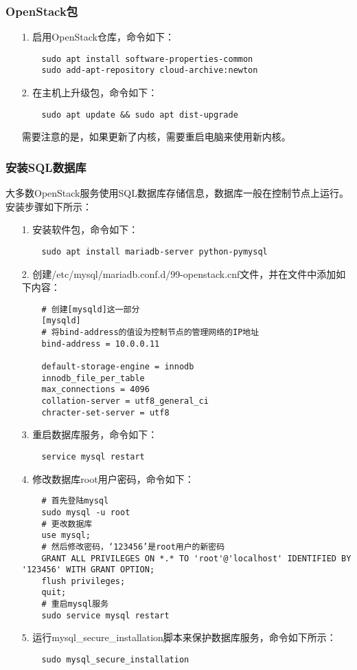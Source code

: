 \documentclass[a4paper,left=2.5cm,right=2.5cm,11pt]{article}
\begin{document}
\subsubsection{OpenStack包}
	\begin{itemize}
		\item[1.] 启用OpenStack仓库，命令如下：
		\begin{lstlisting}
	sudo apt install software-properties-common
	sudo add-apt-repository cloud-archive:newton
		\end{lstlisting}

		\item[2.] 在主机上升级包，命令如下：
		\begin{lstlisting}
	sudo apt update && sudo apt dist-upgrade
		\end{lstlisting}

		需要注意的是，如果更新了内核，需要重启电脑来使用新内核。
	\end{itemize}

\subsubsection{安装SQL数据库}
	大多数OpenStack服务使用SQL数据库存储信息，数据库一般在控制节点上运行。
	安装步骤如下所示：
	\begin{itemize}
		\item[1.] 安装软件包，命令如下：
		\begin{lstlisting}
	sudo apt install mariadb-server python-pymysql
		\end{lstlisting}

		\item[2.] 创建/etc/mysql/mariadb.conf.d/99-openstack.cnf文件，并在文件中添加如下内容：
		\begin{lstlisting}
	# 创建[mysqld]这一部分
	[mysqld]
	# 将bind-address的值设为控制节点的管理网络的IP地址
	bind-address = 10.0.0.11

	default-storage-engine = innodb
	innodb_file_per_table
	max_connections = 4096
	collation-server = utf8_general_ci
	chracter-set-server = utf8
		\end{lstlisting}

		\item[3.] 重启数据库服务，命令如下：
		\begin{lstlisting}
	service mysql restart
		\end{lstlisting}

		\item[4.] 修改数据库root用户密码，命令如下：
		\begin{lstlisting}
	# 首先登陆mysql
	sudo mysql -u root
	# 更改数据库
	use mysql;
	# 然后修改密码，‘123456’是root用户的新密码
	GRANT ALL PRIVILEGES ON *.* TO 'root'@'localhost' IDENTIFIED BY '123456' WITH GRANT OPTION;
	flush privileges;
	quit;
	# 重启mysql服务
	sudo service mysql restart
		\end{lstlisting}

		\item[5.] 运行mysql\_secure\_installation脚本来保护数据库服务，命令如下所示：
		\begin{lstlisting}
	sudo mysql_secure_installation
		\end{lstlisting}
	\end{itemize}
\end{document}
